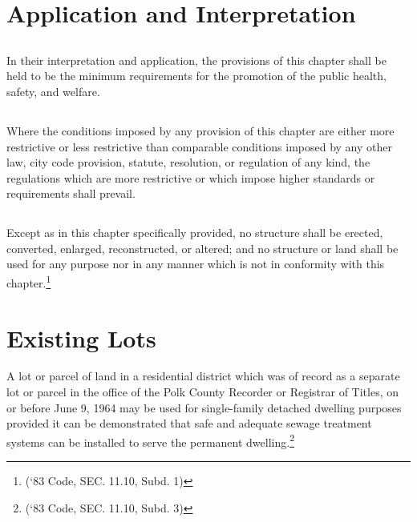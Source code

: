 \section{Application and Interpretation}
\subsection{}
In their interpretation and application, the provisions of this chapter shall be held to be the minimum requirements for the promotion of the public health, safety, and welfare.
\subsection{}
Where the conditions imposed by any provision of this chapter are either more restrictive or less restrictive than comparable conditions imposed by any other law, city code provision, statute, resolution, or regulation of any kind, the regulations which are more restrictive or which impose higher standards or requirements shall prevail.
\subsection{}
Except as in this chapter specifically provided, no structure shall be erected, converted, enlarged, reconstructed, or altered; and no structure or land shall be used for any purpose nor in any manner which is not in conformity with this chapter.\footnote{(‘83 Code, SEC. 11.10, Subd. 1)}

\section{Existing Lots}
A lot or parcel of land in a residential district which was of record as a separate lot or parcel in the office of the Polk County Recorder or Registrar of Titles, on or before June 9, 1964 may be used for single-family detached dwelling purposes provided it can be demonstrated that safe and adequate sewage treatment systems can be installed to serve the permanent dwelling.\footnote{(‘83 Code, SEC. 11.10, Subd. 3)}

